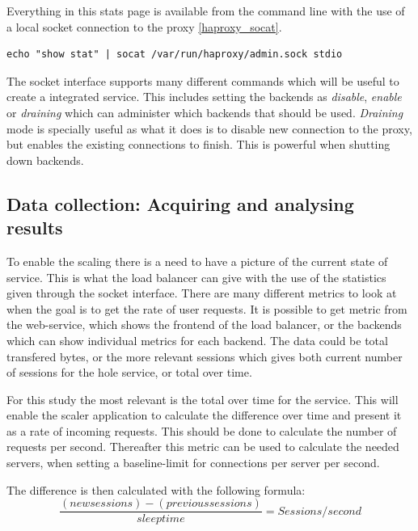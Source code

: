 Everything in this stats page is available from the command line with the use
of a local socket connection to the proxy \ref{haproxy_socat}.

\begin{lstlisting}[label=haproxy_socat,caption=Getting statistics from HAProxy
with sockets,numbers=none]
echo "show stat" | socat /var/run/haproxy/admin.sock stdio
\end{lstlisting}

The socket interface supports many different commands which will be useful to
create a integrated service. This includes setting the backends as
\textit{disable}, \textit{enable} or \textit{draining} which can administer
which backends that should be used. \textit{Draining} mode is specially useful
as what it does is to disable new connection to the proxy, but enables the
existing connections to finish. This is powerful when shutting down backends.

\subsection{Data collection: Acquiring and analysing results}
\label{approach:data}
To enable the scaling there is a need to have a picture of the current state of
service. This is what the load balancer can give with the use of the statistics
given through the socket interface. There are many different metrics to look at
when the goal is to get the rate of user requests. It is possible to get metric
from the web-service, which shows the frontend of the load balancer, or the
backends which can show individual metrics for each backend. The data could be
total transfered bytes, or the more relevant sessions which gives both current
number of sessions for the hole service, or total over time.

For this study the most relevant is the total over time for the service. This
will enable the scaler application to calculate the difference over time and
present it as a rate of incoming requests. This should be done to calculate the
number of requests per second. Thereafter this metric can be used to calculate
the needed servers, when setting a baseline-limit for connections per server
per second.

The difference is then calculated with the following formula:
\begin{equation}
\frac{(newsessions) - (previoussessions)}{sleeptime} =
Sessions/second
\end{equation}

